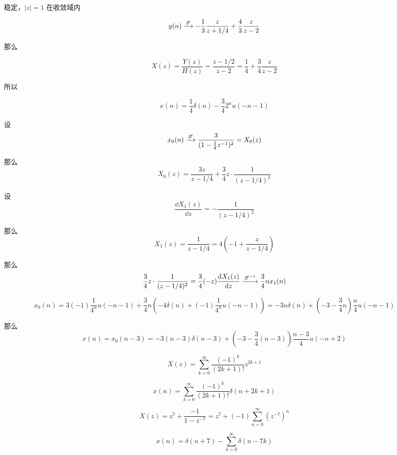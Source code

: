 \documentclass[lang=cn,11pt,a4paper,cite=authoryear]{elegantpaper}
\begin{document}
稳定，\(|z| = 1\) 在收敛域内


\[y(n) \xrightarrow{\mathscr{Z}} -\frac{1}{3} \frac{z}{z+1/4} + \frac{4}{3} \frac{z}{z-2}\]

那么

\[X(z) = \frac{Y(z)}{H(z)} = \frac{z-1/2}{z-2} = \frac{1}{4} + \frac{3}{4} \frac{z}{z-2}\]

所以

\[x(n) = \frac{1}{4} \delta(n) - \frac{3}{4} 2^nu(-n-1)\]



设 
\[x_0(n) \xrightarrow{\mathscr{Z}} \frac{3}{(1-\frac{1}{4}z^{-1})^2} = X_0(z)\]

那么 
\[X_0(z) = \frac{3 z}{z - {1}/{4}} + \frac{3}{4}z \cdot \frac{1}{(z-1/4)^2}\]

设
\[\frac{\dd{X_1(z)}}{\dd{z}} = -\frac{1}{(z-1/4)^2}\]

那么
\[X_1(z) = \frac{1}{z-1/4} = 4(-1+\frac{z}{z-1/4})\]

那么
\[\frac{3}{4}z \cdot \frac{1}{(z-1/4)^2} = \frac{3}{4}(-z)\frac{\mathrm{d}X_1(z)}{\mathrm{d}z} \xrightarrow{\mathscr{Z}^{-1}} \frac{3}{4}nx_1(n)\]


\[x_0(n) = 3(-1)\frac{1}{4^n}u(-n-1) + \frac{3}{4}n(-4\delta(n)+(-1)\frac{1}{4^n}u(-n-1)) = -3n\delta(n) + (-3-\frac{3}{4}n)\frac{n}{4}u(-n-1)\]

那么
\[x(n) = x_0(n-3) = -3(n-3)\delta(n-3)+(-3-\frac{3}{4}(n-3))\frac{n-3}{4}u(-n+2)\]


\[X(z) = \sum_{k=0}^{\infty}\frac{(-1)^k}{(2k+1)!}z^{2k+1}\]

\[x(n) = \sum_{k=0}^{\infty}\frac{(-1)^k}{(2k+1)!}\delta(n+2k+1)\]




\[X(z) = z^7 + \frac{-1}{1-z^{-7}} = z^7 + (-1) \sum_{n=0}^{\infty}(z^{-7})^n\]

\[x(n) = \delta(n+7)-\sum_{k=0}^{\infty}\delta(n-7k)\]
\end{document}
